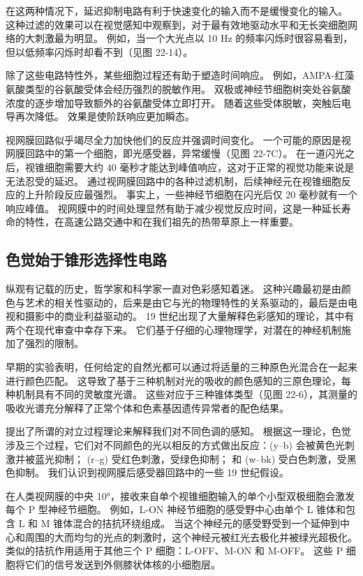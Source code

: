 在这两种情况下，延迟抑制电路有利于快速变化的输入而不是缓慢变化的输入。 这种过滤的效果可以在视觉感知中观察到，对于最有效地驱动水平和无长突细胞网络的大刺激最为明显。 例如，当一个大光点以 10 Hz 的频率闪烁时很容易看到，但以低频率闪烁时却看不到（见图 22-14）。

除了这些电路特性外，某些细胞过程还有助于塑造时间响应。 例如，AMPA-红藻氨酸类型的谷氨酸受体会经历强烈的脱敏作用。 双极或神经节细胞树突处谷氨酸浓度的逐步增加导致额外的谷氨酸受体立即打开。 随着这些受体脱敏，突触后电导再次降低。 效果是使阶跃响应更加瞬态。

视网膜回路似乎竭尽全力加快他们的反应并强调时间变化。 一个可能的原因是视网膜回路中的第一个细胞，即光感受器，异常缓慢（见图 22-7C）。 在一道闪光之后，视锥细胞需要大约 40 毫秒才能达到峰值响应，这对于正常的视觉功能来说是无法忍受的延迟。 通过视网膜回路中的各种过滤机制，后续神经元在视锥细胞反应的上升阶段反应最强烈。 事实上，一些神经节细胞在闪光后仅 20 毫秒就有一个响应峰值。 视网膜中的时间处理显然有助于减少视觉反应时间，这是一种延长寿命的特性，在高速公路交通中和在我们祖先的热带草原上一样重要。

\subsection{色觉始于锥形选择性电路}
纵观有记载的历史，哲学家和科学家一直对色彩感知着迷。 这种兴趣最初是由颜色与艺术的相关性驱动的，后来是由它与光的物理特性的关系驱动的，最后是由电视和摄影中的商业利益驱动的。 19 世纪出现了大量解释色彩感知的理论，其中有两个在现代审查中幸存下来。 它们基于仔细的心理物理学，对潜在的神经机制施加了强烈的限制。

早期的实验表明，任何给定的自然光都可以通过将适量的三种原色光混合在一起来进行颜色匹配。 这导致了基于三种机制对光的吸收的颜色感知的三原色理论，每种机制具有不同的灵敏度光谱。 这些对应于三种锥体类型（见图 22-6），其测量的吸收光谱充分解释了正常个体和色素基因遗传异常者的配色结果。

提出了所谓的对立过程理论来解释我们对不同色调的感知。 根据这一理论，色觉涉及三个过程，它们对不同颜色的光以相反的方式做出反应：(y–b) 会被黄色光刺激并被蓝光抑制； (r–g) 受红色刺激，受绿色抑制； 和 (w–bk) 受白色刺激，受黑色抑制。 我们认识到视网膜后感受器回路中的一些 19 世纪假设。

在人类视网膜的中央 10°，接收来自单个视锥细胞输入的单个小型双极细胞会激发每个 P 型神经节细胞。 例如，L-ON 神经节细胞的感受野中心由单个 L 锥体和包含 L 和 M 锥体混合的拮抗环绕组成。 当这个神经元的感受野受到一个延伸到中心和周围的大而均匀的光点的刺激时，这个神经元被红光去极化并被绿光超极化。 类似的拮抗作用适用于其他三个 P 细胞：L-OFF、M-ON 和 M-OFF。 这些 P 细胞将它们的信号发送到外侧膝状体核的小细胞层。

